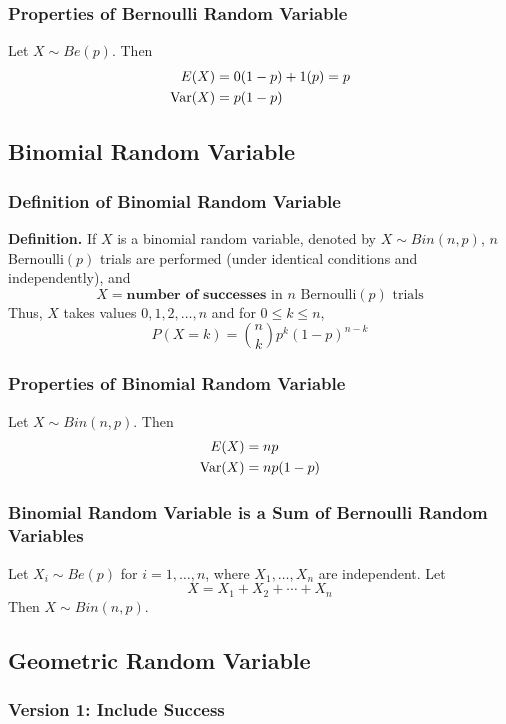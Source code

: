 \documentclass[../st2131_notes.tex]{subfiles}
\begin{document}
\subsubsection{Properties of Bernoulli Random Variable}
Let \(X\sim Be(p)\). Then
\begin{align*}
	E(X)&=0(1-p)+1(p)=p \\
	\operatorname{Var}(X)&=p(1-p)
\end{align*}

\subsection{Binomial Random Variable}
\subsubsection{Definition of Binomial Random Variable}
\textbf{Definition.} If \(X\) is a binomial random variable, denoted by \(X\sim Bin(n,p)\), \(n\) Bernoulli\((p)\) trials are performed (under identical conditions and independently), and
\[X=\textbf{number of successes}\text{ in }n\text{ Bernoulli}(p)\text{ trials}\]
Thus, \(X\) takes values \(0,1,2,\ldots,n\) and for \(0\leq k\leq n\),
\[P(X=k)=\binom{n}{k}p^k(1-p)^{n-k}\]

\subsubsection{Properties of Binomial Random Variable}
Let \(X\sim Bin(n,p)\). Then
\begin{align*}
	E(X)&=np \\
	\operatorname{Var}(X)&=np(1-p)
\end{align*}

\subsubsection{Binomial Random Variable is a Sum of Bernoulli Random Variables}
Let \(X_i\sim Be(p)\) for \(i=1,\ldots,n\), where \(X_1,\ldots,X_n\) are independent. Let
\[X=X_1+X_2+\cdots+X_n\]
Then \(X\sim Bin(n,p)\).

\subsection{Geometric Random Variable}
\subsubsection{Version 1: Include Success}
\end{document}
